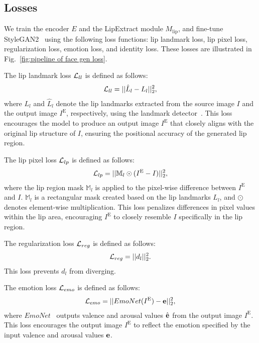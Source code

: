 \subsection{Losses}
\label{sec:lef losses}
We train the encoder $E$ and the LipExtract module $M_\text{lip}$, and fine-tune StyleGAN2~\cite{karras2020analyzing} using the following loss functions: lip landmark loss, lip pixel loss, regularization loss, emotion loss, and identity loss. These losses are illustrated in Fig.~\ref{fig:pipeline of face gen loss}.

The lip landmark loss $\mathcal{L}_{ll}$ is defined as follows:
\begin{eqnarray}
    \mathcal{L}_{ll} = ||\hat{L}_l-L_l||^2_2,
\end{eqnarray}
where $L_l$ and $\hat{L}_l$ denote the lip landmarks extracted from the source image $I$ and the output image $I^\text{E}$, respectively, using the landmark detector~\cite{bulat2017far}. This loss encourages the model to produce an output image $I^\text{E}$ that closely aligns with the original lip structure of $I$, ensuring the positional accuracy of the generated lip region.

The lip pixel loss $\mathcal{L}_{lp}$ is defined as follows:
\begin{eqnarray}
    \mathcal{L}_{lp} = ||\mathbb{M}_l \odot (I^\text{E}-I)||^2_2,
\end{eqnarray}
where the lip region mask $\mathbb{M}_l$ is applied to the pixel-wise difference between $I^\text{E}$ and $I$. $\mathbb{M}_l$ is a rectangular mask created based on the lip landmarks $L_l$, and $\odot$ denotes element-wise multiplication. This loss penalizes differences in pixel values within the lip area, encouraging $I^\text{E}$ to closely resemble $I$ specifically in the lip region.

The regularization loss $\mathcal{L}_{reg}$ is defined as follows:
\begin{eqnarray}
    \mathcal{L}_{reg} = || d_l ||^2_2.
\end{eqnarray}
This loss prevents $d_l$ from diverging.

The emotion loss $\mathcal{L}_{emo}$ is defined as follows:
\begin{eqnarray}
    \mathcal{L}_{emo} = || EmoNet(I^\text{E}) - \mathbf{e} ||^2_2,
\end{eqnarray}
where $EmoNet$~\cite{toisoul2021estimation} outputs valence and arousal values $\hat{\mathbf{e}}$ from the output image $I^\text{E}$. This loss encourages the output image $I^\text{E}$ to reflect the emotion specified by the input valence and arousal values $\mathbf{e}$.

